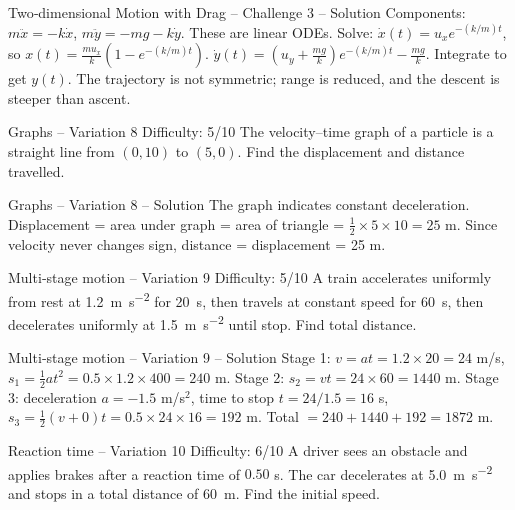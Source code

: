 \documentclass{beamer}
\begin{document}
\begin{frame}[shrink=15]{Two‑dimensional Motion with Drag – Challenge 3 – Solution}
Components: $m\ddot{x} = -k \dot{x}$, $m\ddot{y} = -mg - k \dot{y}$.
These are linear ODEs. Solve:
$\dot{x}(t) = u_x e^{-(k/m)t}$, so $x(t) = \frac{m u_x}{k}(1 - e^{-(k/m)t})$.
$\dot{y}(t) = (u_y + \frac{mg}{k}) e^{-(k/m)t} - \frac{mg}{k}$.
Integrate to get $y(t)$. The trajectory is not symmetric; range is reduced, and the descent is steeper than ascent.
\end{frame}


\begin{frame}[t,shrink=15]{Graphs – Variation 8 \hfill Difficulty: 5/10}
The velocity–time graph of a particle is a straight line from $(0,10)$ to $(5,0)$. Find the displacement and distance travelled.
\end{frame}

\begin{frame}[shrink=15]{Graphs – Variation 8 – Solution}
The graph indicates constant deceleration. Displacement = area under graph = area of triangle = $\frac12 \times 5 \times 10 = 25$ m. Since velocity never changes sign, distance = displacement = 25 m.
\end{frame}

\begin{frame}[t,shrink=15]{Multi‑stage motion – Variation 9 \hfill Difficulty: 5/10}
A train accelerates uniformly from rest at \SI{1.2}{\meter\per\second\squared} for \SI{20}{\second}, then travels at constant speed for \SI{60}{\second}, then decelerates uniformly at \SI{1.5}{\meter\per\second\squared} until stop. Find total distance.
\end{frame}

\begin{frame}[shrink=15]{Multi‑stage motion – Variation 9 – Solution}
Stage 1: $v = at = 1.2\times20 = 24$ m/s, $s_1 = \frac12 a t^2 = 0.5\times1.2\times400 = 240$ m.
Stage 2: $s_2 = vt = 24\times60 = 1440$ m.
Stage 3: deceleration $a = -1.5$ m/s$^2$, time to stop $t = 24/1.5 = 16$ s, $s_3 = \frac12 (v+0)t = 0.5\times24\times16 = 192$ m.
Total $= 240+1440+192 = 1872$ m.
\end{frame}

\begin{frame}[t,shrink=15]{Reaction time – Variation 10 \hfill Difficulty: 6/10}
A driver sees an obstacle and applies brakes after a reaction time of $0.50$ s. The car decelerates at \SI{5.0}{\meter\per\second\squared} and stops in a total distance of \SI{60}{\meter}. Find the initial speed.
\end{frame}
\end{document}
